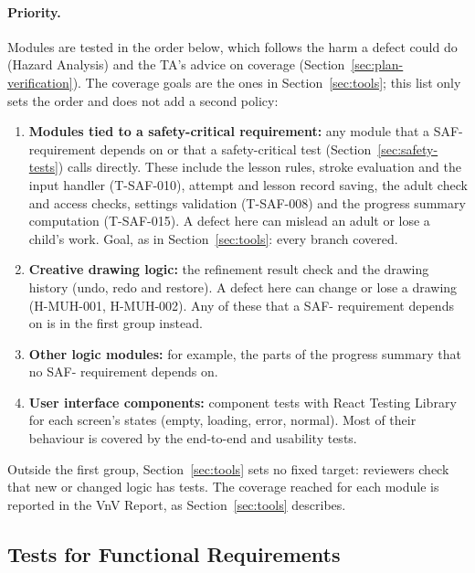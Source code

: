 \documentclass[12pt, titlepage]{article}
\begin{document}
\paragraph{Priority.} Modules are tested in the order below, which follows
the harm a defect could do (Hazard Analysis) and the TA's advice on coverage
(Section~\ref{sec:plan-verification}). The coverage goals are the ones in
Section~\ref{sec:tools}; this list only sets the order and does not add a
second policy:
\begin{enumerate}
\item \textbf{Modules tied to a safety-critical requirement:} any module
that a SAF- requirement depends on or that a safety-critical test
(Section~\ref{sec:safety-tests}) calls directly. These include the lesson
rules, stroke evaluation and the input handler (T-SAF-010), attempt and
lesson record saving, the adult check and access checks, settings
validation (T-SAF-008) and the progress summary computation (T-SAF-015). A
defect here can mislead an adult or lose a child's work. Goal, as in
Section~\ref{sec:tools}: every branch covered.
\item \textbf{Creative drawing logic:} the refinement result check and the
drawing history (undo, redo and restore). A defect here can change or lose a
drawing (H-MUH-001, H-MUH-002). Any of these that a SAF- requirement depends
on is in the first group instead.
\item \textbf{Other logic modules:} for example, the parts of the progress
summary that no SAF- requirement depends on.
\item \textbf{User interface components:} component tests with React Testing
Library for each screen's states (empty, loading, error, normal). Most of
their behaviour is covered by the end-to-end and usability tests.
\end{enumerate}
Outside the first group, Section~\ref{sec:tools} sets no fixed target:
reviewers check that new or changed logic has tests. The coverage reached
for each module is reported in the VnV Report, as Section~\ref{sec:tools}
describes.

\subsection{Tests for Functional Requirements}
\end{document}
